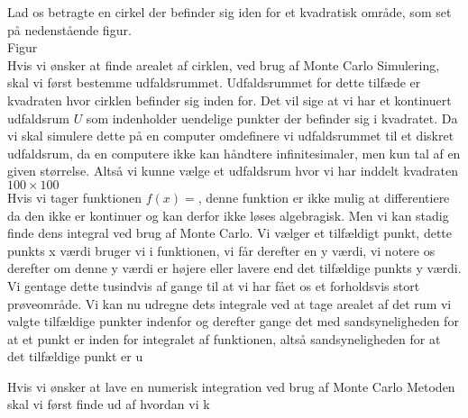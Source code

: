 \documentclass[../../SRP.tex]{subfiles}
\begin{document}
Lad os betragte en cirkel der befinder sig iden for et kvadratisk område, som set på nedenstående figur. \\

Figur \\

Hvis vi ønsker at finde arealet af cirklen, ved brug af Monte Carlo Simulering, skal vi først bestemme udfaldsrummet. Udfaldsrummet for dette tilfæde er kvadraten hvor cirklen befinder sig inden for. Det vil sige at vi har et kontinuert udfaldsrum $U$ som indenholder uendelige punkter der befinder sig i kvadratet. Da vi skal simulere dette på en computer omdefinere vi udfaldsrummet til et diskret udfaldsrum, da en computere ikke kan håndtere infinitesimaler, men kun tal af en given størrelse. Altså vi kunne vælge et udfaldsrum hvor vi har inddelt kvadraten $100 \times 100$ \\



Hvis vi tager funktionen $f(x)=$, denne funktion er ikke mulig at differentiere da den ikke er kontinuer og kan derfor ikke løses algebragisk. Men vi kan stadig finde dens integral ved brug af Monte Carlo. Vi vælger et tilfældigt punkt, dette punkts x værdi bruger vi i funktionen, vi får derefter en y værdi, vi notere os derefter om denne y værdi er højere eller lavere end det tilfældige punkts y værdi. Vi gentage dette tusindvis af gange til at vi har fået os et forholdsvis stort prøveområde. Vi kan nu udregne dets integrale ved at tage arealet af det rum vi valgte tilfældige punkter indenfor og derefter gange det med sandsyneligheden for at et punkt er inden for integralet af funktionen, altså sandsyneligheden for at det tilfældige punkt er u

Hvis vi ønsker at lave en numerisk integration ved brug af Monte Carlo Metoden skal vi først finde ud af hvordan vi k
\end{document}
